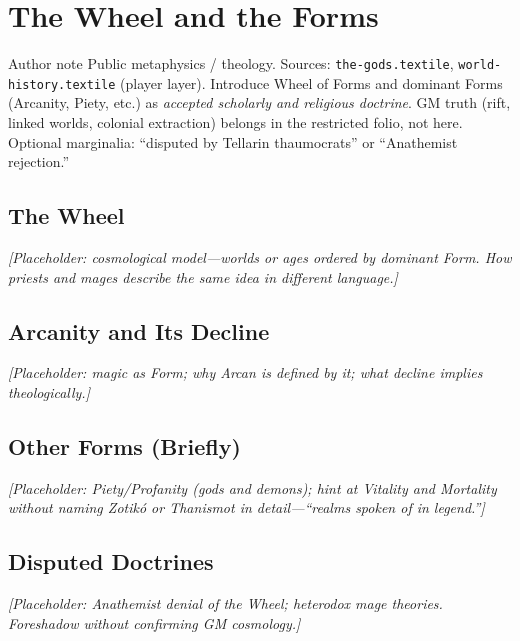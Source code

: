 \chapter{The Wheel and the Forms}

\begin{DndComment}{Author note}
  Public metaphysics / theology. Sources: \texttt{the-gods.textile}, \texttt{world-history.textile} (player layer).
  Introduce Wheel of Forms and dominant Forms (Arcanity, Piety, etc.) as \emph{accepted scholarly and religious doctrine}.
  GM truth (rift, linked worlds, colonial extraction) belongs in the restricted folio, not here.
  Optional marginalia: ``disputed by Tellarin thaumocrats'' or ``Anathemist rejection.''
\end{DndComment}

\section{The Wheel}

\textit{[Placeholder: cosmological model---worlds or ages ordered by dominant Form. How priests and mages describe the same idea in different language.]}

\section{Arcanity and Its Decline}

\textit{[Placeholder: magic as Form; why Arcan is defined by it; what decline implies theologically.]}

\section{Other Forms (Briefly)}

\textit{[Placeholder: Piety/Profanity (gods and demons); hint at Vitality and Mortality without naming Zotikó or Thanismot in detail---``realms spoken of in legend.'']}

\section{Disputed Doctrines}

\textit{[Placeholder: Anathemist denial of the Wheel; heterodox mage theories. Foreshadow without confirming GM cosmology.]}
